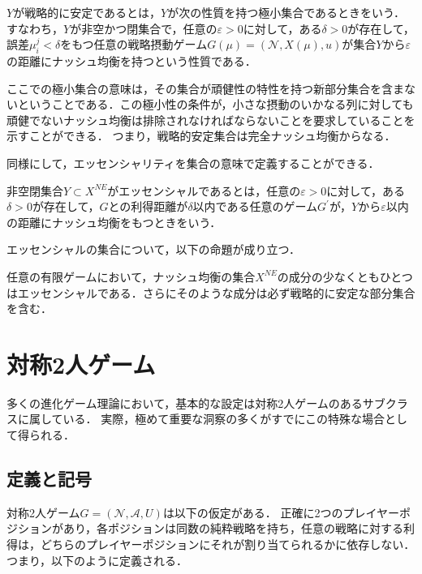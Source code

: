 \documentclass{jsreport}
\begin{document}
\begin{screen}
  \begin{defi}
    $Y$が戦略的に安定であるとは，$Y$が次の性質を持つ極小集合であるときをいう．
    すなわち，$Y$が非空かつ閉集合で，任意の$\varepsilon > 0$に対して，ある$\delta > 0$が存在して，誤差$\mu_i^j < \delta$をもつ任意の戦略摂動ゲーム$G(\mu) = (\mathcal{N}, X(\mu), u)$が集合$Y$から$\varepsilon$の距離にナッシュ均衡を持つという性質である．
  \end{defi}
\end{screen}

ここでの極小集合の意味は，その集合が頑健性の特性を持つ新部分集合を含まないということである．この極小性の条件が，小さな摂動のいかなる列に対しても頑健でないナッシュ均衡は排除されなければならないことを要求していることを示すことができる．
つまり，戦略的安定集合は完全ナッシュ均衡からなる．

同様にして，エッセンシャリティを集合の意味で定義することができる．
\begin{screen}
  \begin{defi}
    非空閉集合$Y \subset X^{NE}$がエッセンシャルであるとは，任意の$\varepsilon > 0$に対して，ある$\delta > 0$が存在して，$G$との利得距離が$\delta$以内である任意のゲーム$G^{\prime}$が，$Y$から$\varepsilon$以内の距離にナッシュ均衡をもつときをいう．
  \end{defi}
\end{screen}

エッセンシャルの集合について，以下の命題が成り立つ．
\begin{screen}
  \begin{prop}
    任意の有限ゲームにおいて，ナッシュ均衡の集合$X^{NE}$の成分の少なくともひとつはエッセンシャルである．さらにそのような成分は必ず戦略的に安定な部分集合を含む．
  \end{prop}
\end{screen}

\section{対称2人ゲーム}
多くの進化ゲーム理論において，基本的な設定は対称2人ゲームのあるサブクラスに属している．
実際，極めて重要な洞察の多くがすでにこの特殊な場合として得られる．

\subsection{定義と記号}
対称2人ゲーム$G = (\mathcal{N}, \mathcal{A}, U)$は以下の仮定がある．
正確に2つのプレイヤーポジションがあり，各ポジションは同数の純粋戦略を持ち，任意の戦略に対する利得は，どちらのプレイヤーポジションにそれが割り当てられるかに依存しない．
つまり，以下のように定義される．
\end{document}
